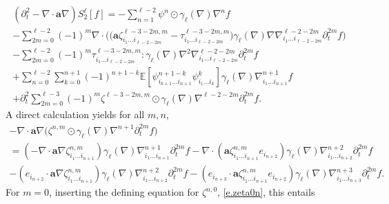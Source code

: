 \documentclass[10pt]{amsart}
\theoremstyle{plain}
\theoremstyle{definition}
\numberwithin{equation}{section}
\newcommand{\ee}{e}
\newcommand{\Aa}{\boldsymbol a}
\newcommand{\expec}[1]{\mathbb{E}\left[ #1 \right]}
\begin{document}
\begin{multline}\label{eq:rep-eqn-S2ell}
(\partial_t^2-\nabla\cdot\Aa\nabla) S_2^\ell[f]
=-\sum_{n=1}^{\ell-2}\psi^{n}\odot\gamma_{\ell}(\nabla)\nabla^{n} f\\[-5pt]
-\sum_{2m=0}^{\ell-2}(-1)^m\nabla\cdot\Big(\big(\Aa\zeta^{\ell-3-2m,m}_{i_1\ldots i_{\ell-2-2m}}-\tau^{\ell-3-2m,m}_{i_1\ldots i_{\ell-2-2m}}\big)\gamma_{\ell}(\nabla)\nabla\nabla^{\ell-2-2m}_{i_1\ldots i_{\ell-2-2m}}\partial_t^{2m} f\Big)\\[-5pt]
-\sum_{2m=0}^{\ell-2}(-1)^m\tau^{\ell-3-2m,m}_{i_1\ldots i_{\ell-2-2m}}:\gamma_{\ell}(\nabla)\nabla^2\nabla^{\ell-2-2m}_{i_1\ldots i_{\ell-2-2m}}\partial_t^{2m} f\\[-2pt]
+\sum_{n=0}^{\ell-2}\sum_{k=0}^{n+1}(-1)^{n+1-k}\expec{\psi^{n+1-k}_{i_{k+1}\ldots i_{n+1}}\psi^k_{i_{1}\ldots i_k}}\gamma_{\ell}(\nabla)\nabla^{n+1}_{i_1\ldots i_{n+1}} f\\[-5pt]
+\partial_t^2\sum_{2m=0}^{\ell-3}(-1)^m\zeta^{\ell-3-2m,m}\odot\gamma_{\ell}(\nabla)\nabla^{\ell-2-2m}\partial_t^{2m} f.
\end{multline}
A direct calculation yields for all $m,n$,\vspace*{-3pt}
\begin{multline*}
-\nabla\cdot\Aa\nabla\big(\zeta^{n,m} \odot \gamma_{\ell}(\nabla)\nabla^{n+1}\partial_t^{2m} f\big)\\
=(-\nabla\cdot\Aa\nabla\zeta^{n,m}_{i_1\ldots i_{n+1}}) \gamma_{\ell}(\nabla)\nabla^{n+1}_{i_1\ldots i_{n+1}}\partial_t^{2m} f
-\nabla\cdot(\Aa\zeta^{n,m}_{i_1\ldots i_{n+1}}\ee_{i_{n+2}}) \gamma_{\ell}(\nabla)\nabla^{n+2}_{i_1\ldots i_{n+2}}\partial_t^{2m} f\\
-(\ee_{i_{n+2}}\cdot\Aa\nabla\zeta^{n,m}_{i_1\ldots i_{n+1}}) \gamma_{\ell}(\nabla)\nabla^{n+2}_{i_1\ldots i_{n+2}}\partial_t^{2m} f
-(\ee_{i_{n+3}}\cdot\Aa\zeta^{n,m}_{i_1\ldots i_{n+1}}\ee_{i_{n+2}}) \gamma_{\ell}(\nabla)\nabla^{n+3}_{i_1\ldots i_{n+3}}\partial_t^{2m} f.
\end{multline*}
For $m=0$, inserting the defining equation for $\zeta^{n,0}$, \cf \eqref{e.zeta0n}, this entails\vspace*{-3pt}
\end{document}
